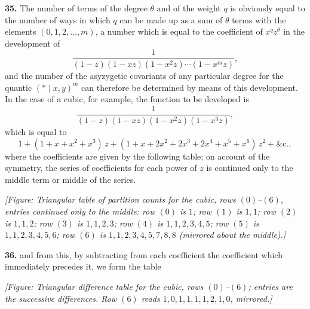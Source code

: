 \documentclass[11pt]{article}
\begin{document}
\textbf{35.} The number of terms of the degree $\theta$ and of the weight $q$ is obviously equal to the number of ways in which $q$ can be made up as a sum of $\theta$ terms with the elements $(0, 1, 2, \ldots, m)$, a number which is equal to the coefficient of $x^q z^\theta$ in the development of
\[
\frac{1}{(1-z)(1-xz)(1-x^2 z)\cdots(1-x^m z)},
\]
and the number of the asyzygetic covariants of any particular degree for the quantic $(*\mid x, y)^m$ can therefore be determined by means of this development. In the case of a cubic, for example, the function to be developed is
\[
\frac{1}{(1-z)(1-xz)(1-x^2 z)(1-x^3 z)},
\]
which is equal to
\[
1 + (1+x+x^2+x^3)\, z + (1+x+2x^2+2x^3+2x^4+x^5+x^6)\, z^2 + \&\text{c.},
\]
where the coefficients are given by the following table; on account of the symmetry, the series of coefficients for each power of $z$ is continued only to the middle term or middle of the series.

\medskip
\noindent\textit{[Figure: Triangular table of partition counts for the cubic, rows $(0)$--$(6)$, entries continued only to the middle:
row $(0)$ is $1$;
row $(1)$ is $1, 1$;
row $(2)$ is $1, 1, 2$;
row $(3)$ is $1, 1, 2, 3$;
row $(4)$ is $1, 1, 2, 3, 4, 5$;
row $(5)$ is $1, 1, 2, 3, 4, 5, 6$;
row $(6)$ is $1, 1, 2, 3, 4, 5, 7, 8, 8$ (mirrored about the middle).]}

\textbf{36.} and from this, by subtracting from each coefficient the coefficient which immediately precedes it, we form the table

\medskip
\noindent\textit{[Figure: Triangular difference table for the cubic, rows $(0)$--$(6)$; entries are the successive differences. Row $(6)$ reads $1, 0, 1, 1, 1, 1, 2, 1, 0$, mirrored.]}
\end{document}
